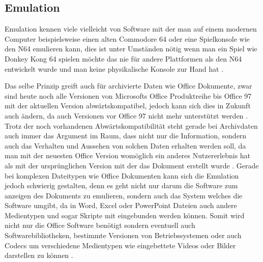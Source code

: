 \documentclass[conference,compsoc,final,a4paper]{IEEEtran}
\begin{document}
\subsection{Emulation}
Emulation kennen viele vielleicht von Software mit der man auf einem modernen Computer beispielsweise einen alten Commodore 64 oder eine Spielkonsole wie den N64 emulieren kann, dies ist unter Umständen nötig wenn man ein Spiel wie Donkey Kong 64 spielen möchte das nie für andere Plattformen als den N64 entwickelt wurde und man keine physikalische Konsole zur Hand hat \autocite{ViceEmu,Project64}.

Das selbe Prinzip greift auch für archivierte Daten wie Office Dokumente, zwar sind heute noch alle Versionen von Microsofts Office Produktreihe bis Office 97 mit der aktuellen Version abwärtskompatibel, jedoch kann sich dies in Zukunft auch ändern, da auch Versionen vor Office 97 nicht mehr unterstützt werden \autocite{MSOfficeFileFormats}. Trotz der noch vorhandenen Abwärtskompatibilität steht gerade bei Archivdaten auch immer das Argument im Raum, dass nicht nur die Information, sondern auch das Verhalten und Aussehen von solchen Daten erhalten werden soll, da man mit der neuesten Office Version womöglich ein anderes Nutzererlebnis hat als mit der ursprünglichen Version mit der das Dokument erstellt wurde \autocite{Lee2002}. Gerade bei komplexen Dateitypen wie Office Dokumenten kann sich die Emulation jedoch schwierig gestalten, denn es geht nicht nur darum die Software zum anzeigen des Dokuments zu emulieren, sondern auch das System welches die Software umgibt, da in Word, Excel oder PowerPoint Dateien auch andere Medientypen und sogar Skripte mit eingebunden werden können. Somit wird nicht nur die Office Software benötigt sondern eventuell auch Softwarebibliotheken, bestimmte Versionen von Betriebssystemen oder auch Codecs um verschiedene Medientypen wie eingebettete Videos oder Bilder darstellen zu können \autocite{Reichherzer2006}.
\end{document}
